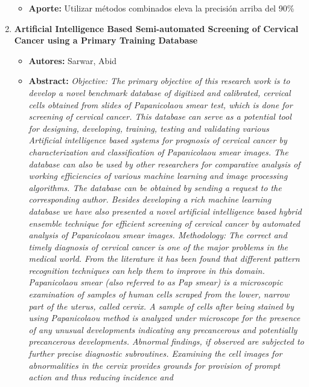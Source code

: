 \begin{enumerate}[label=\textbf{\arabic*}]
\begin{itemize}
        \item{\textbf{Aporte:}} Utilizar métodos combinados eleva la precisión
        arriba del 90\%
    \end{itemize}
    \item \textbf{Artificial Intelligence Based Semi-automated Screening of Cervical Cancer using a Primary Training Database}~\cite{Sarwar2016}
    \begin{itemize} 
        \item{\textbf{Autores:}} Sarwar, Abid
        \item{\textbf{Abstract:}} \textit{Objective: The primary objective of
        this research work is to develop a novel benchmark database of digitized
        and calibrated, cervical cells obtained from slides of Papanicolaou
        smear test, which is done for screening of cervical cancer. This
        database can serve as a potential tool for designing, developing,
        training, testing and validating various Artificial intelligence based
        systems for prognosis of cervical cancer by characterization and
        classification of Papanicolaou smear images. The database can also be
        used by other researchers for comparative analysis of working
        efficiencies of various machine learning and image processing
        algorithms. The database can be obtained by sending a request to the
        corresponding author. Besides developing a rich machine learning
        database we have also presented a novel artificial intelligence based
        hybrid ensemble technique for efficient screening of cervical cancer by
        automated analysis of Papanicolaou smear images. Methodology: The
        correct and timely diagnosis of cervical cancer is one of the major
        problems in the medical world. From the literature it has been found
        that different pattern recognition techniques can help them to improve
        in this domain. Papanicolaou smear (also referred to as Pap smear) is a
        microscopic examination of samples of human cells scraped from the
        lower, narrow part of the uterus, called cervix. A sample of cells after
        being stained by using Papanicolaou method is analyzed under microscope
        for the presence of any unusual developments indicating any precancerous
        and potentially precancerous developments. Abnormal findings, if
        observed are subjected to further precise diagnostic subroutines.
        Examining the cell images for abnormalities in the cervix provides
        grounds for provision of prompt action and thus reducing incidence and
}
\end{itemize}
\end{enumerate}
